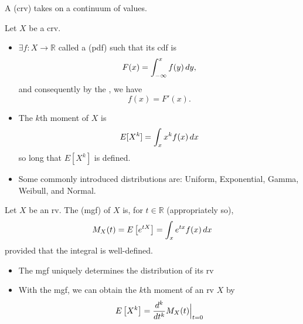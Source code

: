 \documentclass[notoc,notitlepage]{tufte-book}
\begin{document}
\begin{defn}
\label{defn:continuous_random_variable}
  A  (crv) takes on a continuum of values.
\end{defn}

\begin{note}
  Let $X$ be a crv.
  \begin{itemize}
    \item $\exists f : X \to \mathbb{R}$ called a  (pdf) such that its cdf is
      \begin{equation*}
        F(x) = \int_{-\infty}^{x} f(y) \mathop{}\!d{y},
      \end{equation*}
      and consequently by the , we have
      \begin{equation*}
        f(x) = F'(x).
      \end{equation*}

    \item The $k$th moment of $X$ is
      \begin{equation*}
        E[X^k] = \int_{x} x^k f(x) \mathop{}\!d{x} 
      \end{equation*}
      so long that $E[X^k]$ is defined.
      
    \item Some commonly introduced distributions are: Uniform, Exponential, Gamma, Weibull, and Normal.
  \end{itemize}
\end{note}

\begin{defn}
\label{defn:moment_generating_function}
Let $X$ be an rv. The  (mgf) of $X$ is, for $t \in \mathbb{R}$ (appropriately so),
  \begin{equation*}
    M_X(t) = E\left[e^{tX}\right] = \int_{x} e^{tx} f(x) \mathop{}\!d{x}
  \end{equation*}
  provided that the integral is well-defined.
\end{defn}

\begin{note}
  \begin{itemize}
    \item The mgf uniquely determines the distribution of its rv

    \item With the mgf, we can obtain the $k$th moment of an rv $X$ by
      \begin{equation*}
        E\left[X^k\right] = \frac{d^k}{dt^k} M_X(t) \Big|_{t = 0}^{}
      \end{equation*}
  \end{itemize}
\end{note}
\end{document}

